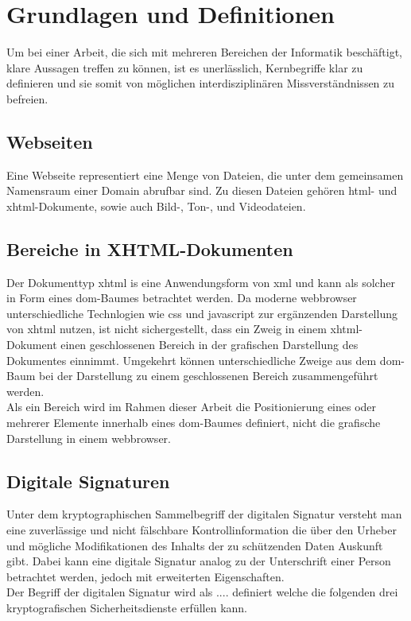 
\chapter{Grundlagen und Definitionen}
\label{chp:GrundlagenDefinitionen}

Um bei einer Arbeit, die sich mit mehreren Bereichen der Informatik beschäftigt, klare Aussagen treffen zu können, ist es unerlässlich, Kernbegriffe klar zu
definieren und sie somit von möglichen interdisziplinären Missverständnissen zu befreien.

\section{Webseiten}
\label{sec:GrundlagenDefinitionen:Webseiten}
Eine Webseite representiert eine Menge von Dateien, die unter dem gemeinsamen Namensraum einer Domain abrufbar sind. Zu diesen Dateien gehören \gls{html}- und
\gls{xhtml}-Dokumente, sowie auch Bild-, Ton-, und Videodateien.

\section{Bereiche in XHTML-Dokumenten}
\label{sec:GrundlagenDefinitionen:BereicheXHTML}
Der Dokumenttyp \gls{xhtml} is eine Anwendungsform von \gls{xml}\cite{xhtml:w3c} und kann als solcher in Form eines \gls{dom}-Baumes
betrachtet werden\cite{xhtml:oreilly}. Da moderne \Gls{webbrowser} unterschiedliche Technlogien wie \gls{css} und \gls{javascript} zur ergänzenden Darstellung von
\gls{xhtml} nutzen, ist nicht sichergestellt, dass ein Zweig in einem \gls{xhtml}-Dokument einen geschlossenen Bereich in der grafischen Darstellung des
Dokumentes einnimmt. Umgekehrt können unterschiedliche Zweige aus dem \gls{dom}-Baum bei der Darstellung zu einem geschlossenen Bereich zusammengeführt werden.\\
Als ein Bereich wird im Rahmen dieser Arbeit die Positionierung eines oder mehrerer Elemente innerhalb eines \gls{dom}-Baumes definiert, nicht die grafische
Darstellung in einem \gls{webbrowser}.

\section{Digitale Signaturen}
\label{sec:GrundlagenDefinitionen:DigitaleSignaturen}
Unter dem kryptographischen Sammelbegriff der digitalen Signatur versteht man eine zuverlässige und nicht fälschbare Kontrollinformation die über den Urheber
und mögliche Modifikationen des Inhalts der zu schützenden Daten Auskunft gibt\cite{kits}. Dabei kann eine digitale Signatur analog zu der Unterschrift
einer Person betrachtet werden\cite{esig:bsi}, jedoch mit erweiterten Eigenschaften.\\
Der Begriff der digitalen Signatur wird als .... definiert welche die folgenden drei kryptografischen Sicherheitsdienste erfüllen kann.

